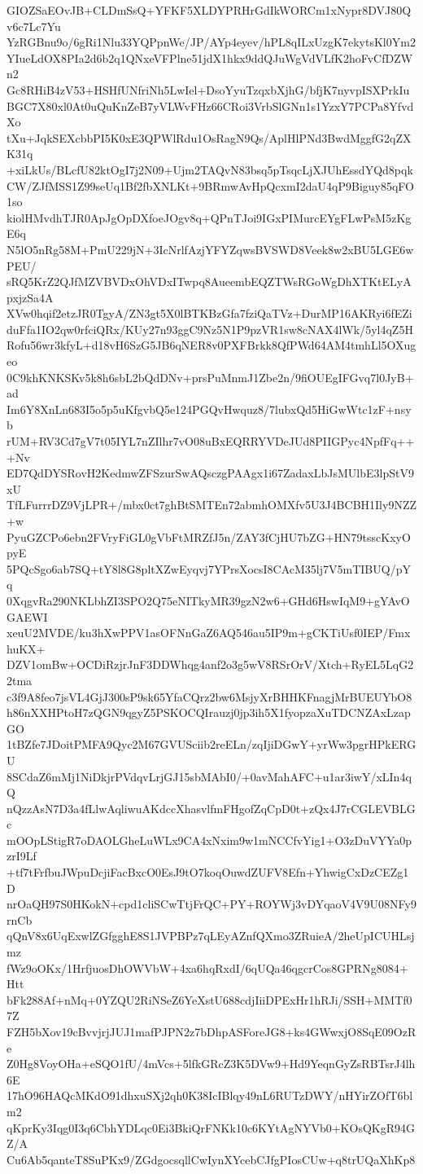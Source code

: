 GIOZSaEOvJB+CLDmSsQ+YFKF5XLDYPRHrGdIkWORCm1xNypr8DVJ80Qv6c7Lc7Yu
YzRGBnu9o/6gRi1Nlu33YQPpnWe/JP/AYp4eyev/hPL8qILxUzgK7ekytsKl0Ym2
YIueLdOX8PIa2d6b2q1QNxeVFPlne51jdX1hkx9ddQJuWgVdVLfK2hoFvCfDZWn2
Gc8RHiB4zV53+HSHfUNfriNh5LwIel+DsoYyuTzqxbXjhG/bfjK7nyvpISXPrkIu
BGC7X80xl0At0uQuKnZeB7yVLWvFHz66CRoi3VrbSlGNn1s1YzxY7PCPa8YfvdXo
tXu+JqkSEXcbbPI5K0xE3QPWlRdu1OsRagN9Qs/AplHlPNd3BwdMggfG2qZXK31q
+xiLkUs/BLcfU82ktOgI7j2N09+Ujm2TAQvN83bsq5pTsqcLjXJUhEssdYQd8pqk
CW/ZJfMSS1Z99seUq1Bf2fbXNLKt+9BRmwAvHpQcxmI2daU4qP9Biguy85qFO1so
kiolHMvdhTJR0ApJgOpDXfoeJOgv8q+QPnTJoi9IGxPIMurcEYgFLwPsM5zKgE6q
N5lO5nRg58M+PmU229jN+3IcNrlfAzjYFYZqwsBVSWD8Veek8w2xBU5LGE6wPEU/
sRQ5KrZ2QJfMZVBVDxOhVDxITwpq8AueembEQZTWsRGoWgDhXTKtELyApxjzSa4A
XVw0hqif2etzJR0TgyA/ZN3gt5X0lBTKBzGfa7fziQaTVz+DurMP16AKRyi6fEZi
duFfa1IO2qw0rfciQRx/KUy27n93ggC9Nz5N1P9pzVR1sw8cNAX4lWk/5yl4qZ5H
Rofu56wr3kfyL+d18vH6SzG5JB6qNER8v0PXFBrkk8QfPWd64AM4tmhLl5OXugeo
0C9khKNKSKv5k8h6sbL2bQdDNv+prsPuMnmJ1Zbe2n/9fiOUEgIFGvq7l0JyB+ad
Im6Y8XnLn683I5o5p5uKfgvbQ5e124PGQvHwquz8/7lubxQd5HiGwWtc1zF+nsyb
rUM+RV3Cd7gV7t05IYL7nZIlhr7vO08uBxEQRRYVDeJUd8PIIGPyc4NpfFq+++Nv
ED7QdDYSRovH2KedmwZFSzurSwAQsczgPAAgx1i67ZadaxLbJsMUlbE3lpStV9xU
TfLFurrrDZ9VjLPR+/mbx0ct7ghBtSMTEn72abmhOMXfv5U3J4BCBH1Ily9NZZ+w
PyuGZCPo6ebn2FVryFiGL0gVbFtMRZfJ5n/ZAY3fCjHU7bZG+HN79tsscKxyOpyE
5PQcSgo6ab7SQ+tY8l8G8pltXZwEyqvj7YPrsXocsI8CAcM35lj7V5mTIBUQ/pYq
0XqgvRa290NKLbhZI3SPO2Q75eNITkyMR39gzN2w6+GHd6HswIqM9+gYAvOGAEWI
xeuU2MVDE/ku3hXwPPV1asOFNnGaZ6AQ546au5IP9m+gCKTiUsf0IEP/FmxhuKX+
DZV1omBw+OCDiRzjrJnF3DDWhqg4anf2o3g5wV8RSrOrV/Xtch+RyEL5LqG22tma
c3f9A8feo7jsVL4GjJ300sP9sk65YfaCQrz2bw6MsjyXrBHHKFnagjMrBUEUYbO8
h86nXXHPtoH7zQGN9qgyZ5PSKOCQIrauzj0jp3ih5X1fyopzaXuTDCNZAxLzapGO
1tBZfe7JDoitPMFA9Qyc2M67GVUSciib2reELn/zqIjiDGwY+yrWw3pgrHPkERGU
8SCdaZ6mMj1NiDkjrPVdqvLrjGJ15sbMAbI0/+0avMahAFC+u1ar3iwY/xLIn4qQ
nQzzAsN7D3a4fLlwAqliwuAKdccXhasvlfmFHgofZqCpD0t+zQx4J7rCGLEVBLGc
mOOpLStigR7oDAOLGheLuWLx9CA4xNxim9w1mNCCfvYig1+O3zDuVYYa0pzrI9Lf
+tf7tFrfbuJWpuDcjiFacBxcO0EsJ9tO7koqOuwdZUFV8Efn+YhwigCxDzCEZg1D
nrOaQH97S0HKokN+cpd1cliSCwTtjFrQC+PY+ROYWj3vDYqaoV4V9U08NFy9rnCb
qQnV8x6UqExwlZGfgghE8S1JVPBPz7qLEyAZnfQXmo3ZRuieA/2heUpICUHLsjmz
fWz9oOKx/1HrfjuosDhOWVbW+4xa6hqRxdI/6qUQa46qgcrCos8GPRNg8084+Htt
bFk288Af+nMq+0YZQU2RiNSeZ6YeXstU688cdjIiiDPExHr1hRJi/SSH+MMTf07Z
FZH5bXov19cBvvjrjJUJ1mafPJPN2z7bDhpASForeJG8+ks4GWwxjO8SqE09OzRe
Z0Hg8VoyOHa+eSQO1fU/4mVcs+5lfkGRcZ3K5DVw9+Hd9YeqnGyZsRBTsrJ4lh6E
17hO96HAQcMKdO91dhxuSXj2qh0K38IcIBlqy49nL6RUTzDWY/nHYirZOfT6blm2
qKprKy3Iqg0I3q6CbhYDLqc0Ei3BkiQrFNKk10c6KYtAgNYVb0+KOsQKgR94GZ/A
Cu6Ab5qanteT8SuPKx9/ZGdgocsqllCwIynXYcebCJfgPIosCUw+q8trUQaXhKp8
